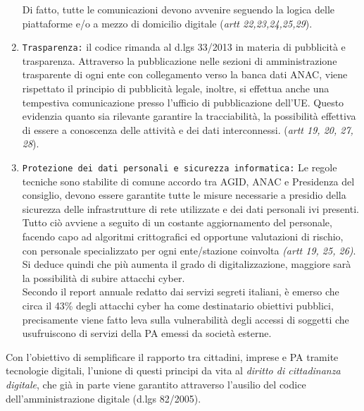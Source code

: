\documentclass{article}
\begin{document}
\begin{justify}
\begin{enumerate}
        Di fatto, tutte le comunicazioni devono avvenire seguendo la logica delle piattaforme e/o a mezzo di domicilio digitale (\textit{artt 22,23,24,25,29}).
        \item \texttt{Trasparenza:} il codice rimanda al d.lgs 33/2013 in materia di pubblicità e trasparenza.
        Attraverso la pubblicazione nelle sezioni di amministrazione trasparente di ogni ente con collegamento verso la banca dati ANAC, viene rispettato il principio di pubblicità legale, inoltre, si effettua anche una tempestiva comunicazione presso l'ufficio di pubblicazione dell'UE.
        Questo evidenzia quanto sia rilevante garantire la tracciabilità, la possibilità effettiva di essere a conoscenza delle attività e dei dati interconnessi. (\textit{artt 19, 20, 27, 28}).
        \item \texttt{Protezione dei dati personali e sicurezza informatica:}
        Le regole tecniche sono stabilite di comune accordo tra AGID, ANAC e Presidenza del consiglio, devono essere garantite tutte le misure necessarie a presidio della sicurezza delle infrastrutture di rete utilizzate e dei dati personali ivi presenti. Tutto ciò avviene a seguito di un costante aggiornamento del personale, facendo capo ad algoritmi crittografici ed opportune valutazioni di rischio, con personale specializzato per ogni ente/stazione coinvolta \textit{(artt 19, 25, 26)}. \\Si deduce quindi che più aumenta il grado di digitalizzazione, maggiore sarà la possibilità di subire attacchi cyber.\\
        Secondo il report annuale redatto dai servizi segreti italiani, è emerso che circa il 43\% degli attacchi cyber ha come destinatario obiettivi pubblici, precisamente viene fatto leva sulla vulnerabilità degli accessi di soggetti che usufruiscono di servizi della PA emessi da società esterne.\citep{ChiomentiPA}\\
    \end{enumerate}
    Con l'obiettivo di semplificare il rapporto tra cittadini, imprese e PA tramite tecnologie digitali, l'unione di questi principi da vita al \textit{diritto di cittadinanza digitale}, che già in parte viene garantito attraverso l'ausilio del codice dell'amministrazione digitale (d.lgs 82/2005).
\end{justify}
\end{document}
